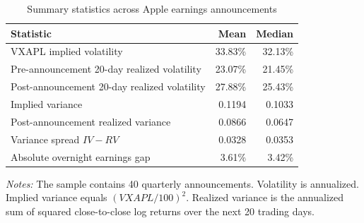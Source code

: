 \begin{table}[!htbp]
\centering
\caption{Summary statistics across Apple earnings announcements}
\label{tab:summary}
\begin{tabular}{lrr}
\toprule
Statistic & Mean & Median \\
\midrule
VXAPL implied volatility & 33.83\% & 32.13\% \\
Pre-announcement 20-day realized volatility & 23.07\% & 21.45\% \\
Post-announcement 20-day realized volatility & 27.88\% & 25.43\% \\
Implied variance & 0.1194 & 0.1033 \\
Post-announcement realized variance & 0.0866 & 0.0647 \\
Variance spread $IV-RV$ & 0.0328 & 0.0353 \\
Absolute overnight earnings gap & 3.61\% & 3.42\% \\
\bottomrule
\end{tabular}
\begin{minipage}{0.92\linewidth}
\footnotesize \textit{Notes:} The sample contains 40 quarterly announcements. Volatility is annualized. Implied variance equals $(VXAPL/100)^2$. Realized variance is the annualized sum of squared close-to-close log returns over the next 20 trading days.
\end{minipage}
\end{table}
